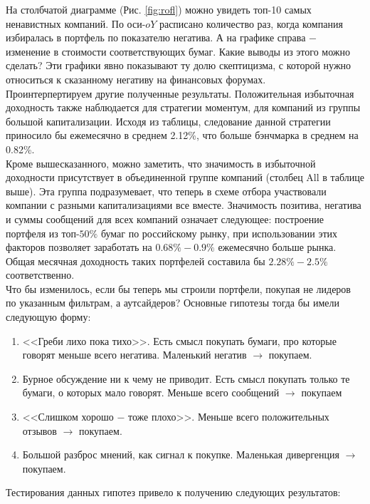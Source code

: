 \documentclass{article}
\begin{document}
На столбчатой диаграмме (Рис. \ref{fig:rofl}) можно увидеть топ-10 самых ненавистных компаний. По оси-$oY$ расписано количество раз, когда компания избиралась в портфель по показателю негатива. А на графике справа $-$ изменение в стоимости соответствующих бумаг. Какие выводы из этого можно сделать? Эти графики явно показывают ту долю скептицизма, с которой нужно относиться к сказанному негативу на финансовых форумах.  \\

Проинтерпертируем другие полученные результаты. Положительная избыточная доходность также наблюдается для стратегии моментум, для компаний из группы большой капитализации. Исходя из таблицы, следование данной стратегии приносило бы ежемесячно в среднем 2.12\%, что больше бэнчмарка в среднем на 0.82\%. \\
Кроме вышесказанного, можно заметить, что значимость в избыточной доходности присутствует в объединенной группе компаний (столбец All в таблице выше). Эта группа подразумевает, что теперь в схеме отбора участвовали компании с разными капитализациями все вместе. Значимость позитива, негатива и суммы сообщений для всех компаний означает следующее: построение портфеля из топ-$50\%$ бумаг по российскому рынку, при использовании этих факторов позволяет заработать на $0.68\% - 0.9\%$ ежемесячно больше рынка. Общая месячная доходность таких портфелей составила бы $2.28\% - 2.5\%$ соответственно. \\

Что бы изменилось, если бы теперь мы строили портфели, покупая не лидеров по указанным фильтрам, а аутсайдеров? Основные гипотезы тогда бы имели следующую форму:

\begin{enumerate}
	\item <<Греби лихо пока тихо>>. Есть смысл покупать бумаги, про которые говорят меньше всего негатива. Маленький негатив $\to$ покупаем.
	\item Бурное обсуждение ни к чему не приводит. Есть смысл покупать только те бумаги, о которых мало говорят. Меньше всего сообщений $\to$ покупаем
	\item <<Слишком хорошо $- $ тоже плохо>>. Меньше всего положительных отзывов $\to$ покупаем.
	\item Большой разброс мнений, как сигнал к покупке. Маленькая дивергенция  $\to$ покупаем.
\end{enumerate}

Тестирования данных гипотез привело к получению следующих результатов:
\end{document}
